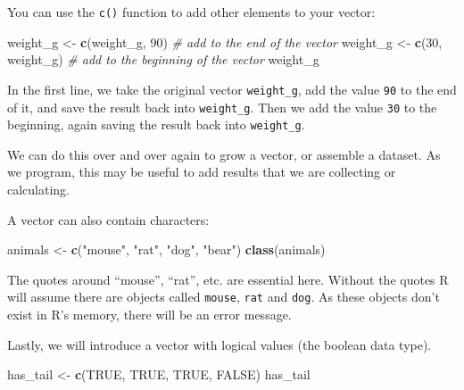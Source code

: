 \documentclass[]{book}
\newenvironment{Shaded}{\begin{snugshade}}{\end{snugshade}}
\newcommand{\KeywordTok}[1]{\textcolor[rgb]{0.13,0.29,0.53}{\textbf{#1}}}
\newcommand{\DecValTok}[1]{\textcolor[rgb]{0.00,0.00,0.81}{#1}}
\newcommand{\StringTok}[1]{\textcolor[rgb]{0.31,0.60,0.02}{#1}}
\newcommand{\CommentTok}[1]{\textcolor[rgb]{0.56,0.35,0.01}{\textit{#1}}}
\newcommand{\OtherTok}[1]{\textcolor[rgb]{0.56,0.35,0.01}{#1}}
\newcommand{\NormalTok}[1]{#1}
\theoremstyle{definition}
\theoremstyle{definition}
\theoremstyle{remark}
\begin{document}
You can use the \texttt{c()} function to add other elements to your
vector:

\begin{Shaded}
\begin{Highlighting}[]
\NormalTok{weight_g <-}\StringTok{ }\KeywordTok{c}\NormalTok{(weight_g, }\DecValTok{90}\NormalTok{) }\CommentTok{# add to the end of the vector}
\NormalTok{weight_g <-}\StringTok{ }\KeywordTok{c}\NormalTok{(}\DecValTok{30}\NormalTok{, weight_g) }\CommentTok{# add to the beginning of the vector}
\NormalTok{weight_g}
\end{Highlighting}
\end{Shaded}

In the first line, we take the original vector \texttt{weight\_g}, add
the value \texttt{90} to the end of it, and save the result back into
\texttt{weight\_g}. Then we add the value \texttt{30} to the beginning,
again saving the result back into \texttt{weight\_g}.

We can do this over and over again to grow a vector, or assemble a
dataset. As we program, this may be useful to add results that we are
collecting or calculating.

A vector can also contain characters:

\begin{Shaded}
\begin{Highlighting}[]
\NormalTok{animals <-}\StringTok{ }\KeywordTok{c}\NormalTok{(}\StringTok{"mouse"}\NormalTok{, }\StringTok{"rat"}\NormalTok{, }\StringTok{"dog"}\NormalTok{, }\StringTok{"bear"}\NormalTok{)}
\KeywordTok{class}\NormalTok{(animals)}
\end{Highlighting}
\end{Shaded}

The quotes around ``mouse'', ``rat'', etc. are essential here. Without
the quotes R will assume there are objects called \texttt{mouse},
\texttt{rat} and \texttt{dog}. As these objects don't exist in R's
memory, there will be an error message.

Lastly, we will introduce a vector with logical values (the boolean data
type).

\begin{Shaded}
\begin{Highlighting}[]
\NormalTok{has_tail <-}\StringTok{ }\KeywordTok{c}\NormalTok{(}\OtherTok{TRUE}\NormalTok{, }\OtherTok{TRUE}\NormalTok{, }\OtherTok{TRUE}\NormalTok{, }\OtherTok{FALSE}\NormalTok{)}
\NormalTok{has_tail }
\end{Highlighting}
\end{Shaded}
\end{document}
